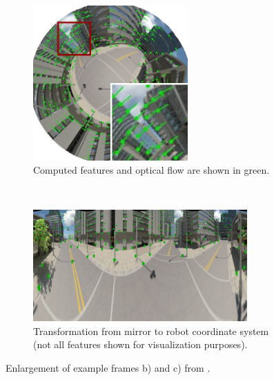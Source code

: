 \begin{figure}
  \centering
  \begin{subfigure}[]{\textwidth}
    \centering
    \includegraphics[width=0.65\textwidth]{./figures/robot/method_systemstructure_features_frame.jpg}
    \caption{Computed features and optical flow are shown in green.}
    \label{fig:robot_methods_flowchart_enlargement_features}
  \end{subfigure}\\
  \begin{subfigure}[]{\textwidth}
    \centering
    \includegraphics[width=0.9\textwidth]{./figures/robot/method_systemstructure_transform_canyonfeatures.jpg}
    \caption{Transformation from mirror to robot coordinate system (not all features shown for visualization purposes).}
    \label{fig:robot_method_systemstructure_enlargement_transform}
  \end{subfigure}
  \caption{Enlargement of example frames b) and c) from .}
  \label{fig:robot_methods_flowchart_enlargement}
\end{figure}





